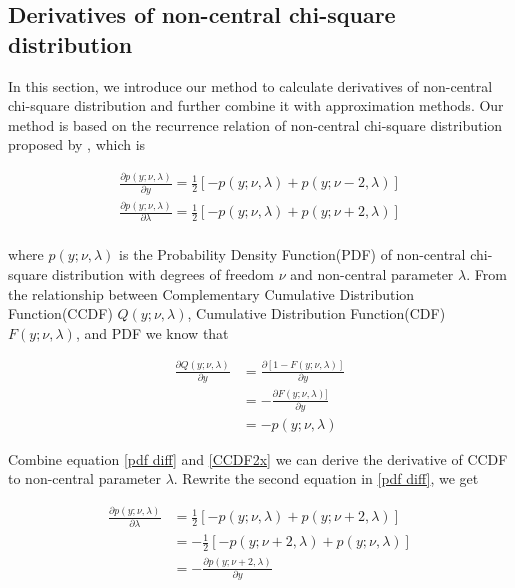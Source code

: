 \subsection{Derivatives of non-central chi-square distribution}

In this section, we introduce our method to calculate derivatives of non-central chi-square distribution and further combine it with approximation methods. Our method is based on the recurrence relation of non-central chi-square distribution proposed by \cite{cohen_noncentral_1988}, which is

\begin{equation}\label{pdf diff}
    \begin{gathered}
        \frac{\partial p(y;\nu,\lambda)}{\partial y}=\frac{1}{2}[-p(y ; \nu, \lambda)+p(y ; \nu-2, \lambda)]\\
        \frac{\partial p(y;\nu,\lambda)}{\partial \lambda}=\frac{1}{2}[-p(y ; \nu, \lambda)+p(y ; \nu+2, \lambda)] \\
    \end{gathered}
\end{equation}

\noindent where $p(y;\nu,\lambda)$ is the Probability Density Function(PDF) of non-central chi-square distribution with degrees of freedom $\nu$ and non-central parameter $\lambda$. From the relationship between Complementary Cumulative Distribution Function(CCDF) $Q(y;\nu,\lambda)$, Cumulative Distribution Function(CDF) $F(y;\nu,\lambda)$, and PDF we know that

\begin{equation}\label{CCDF2x}
    \begin{aligned}
        \frac{\partial Q(y; \nu, \lambda)}{\partial y}&=\frac{\partial[1-F(y; \nu, \lambda)]}{\partial y} \\ 
        &=-\frac{\partial F(y; \nu, \lambda)]}{\partial y}\\
        &= -p(y;\nu,\lambda)
    \end{aligned}
\end{equation}

Combine equation \eqref{pdf diff} and \eqref{CCDF2x} we can derive the derivative of CCDF to non-central parameter $\lambda$. Rewrite the second equation in \eqref{pdf diff}, we get

\begin{equation}\label{pdf trans}
    \begin{aligned}
        \frac{\partial p(y;\nu,\lambda)}{\partial \lambda}&=\frac{1}{2}[-p(y ; \nu, \lambda)+p(y ; \nu+2, \lambda)] \\
        &=-\frac{1}{2}[-p(y ; \nu+2, \lambda)+p(y ; \nu, \lambda)]\\
        &= -\frac{\partial p(y;\nu+2,\lambda)}{\partial y}
    \end{aligned}
\end{equation}

